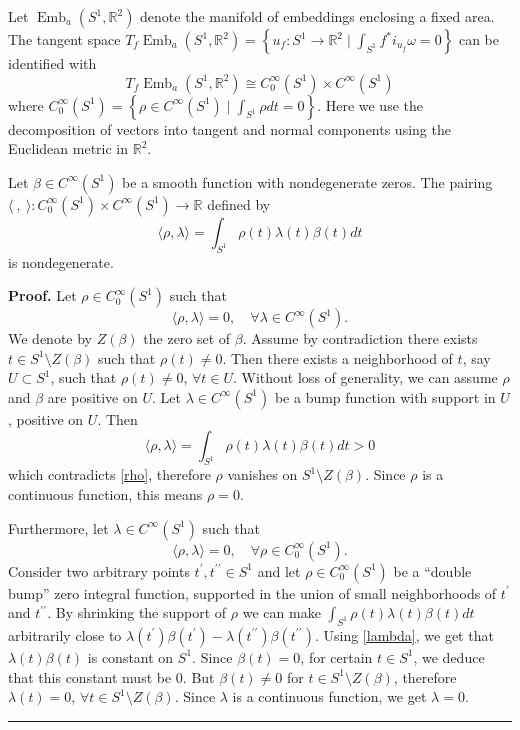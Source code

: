 \documentclass[11pt]{article}
\newcommand\on{\operatorname}
\newcommand\Emb{\on{Emb}}
\newcommand\RR{\mathbb R}
\newenvironment{proof}[1][Proof]{\noindent\textbf{#1.} }{\ \rule{0.5em}{0.5em}}
\begin{document}
Let $\Emb_a(S^1, \RR^2)$ denote the manifold of embeddings enclosing a fixed area. The tangent space $T_f\Emb_a(S^1, \RR^2) = \left\{u_f : S^1 \rightarrow \RR^2 \mid \int_{S^1}f^*i_{u_f}\omega = 0\right\}$ can be identified with
\begin{equation}\label{tg_space}
T_f\Emb_a(S^1, \RR^2) \cong C_0^\infty(S^1) \times C^\infty(S^1)
\end{equation}
where $C_0^\infty(S^1) = \left\{\rho \in C^\infty(S^1) \mid \int_{S^1}\rho dt = 0\right\}$. Here we use the decomposition of vectors into tangent and normal components using the Euclidean metric in $\RR^2$. 


\begin{lemma}
Let $\beta \in C^\infty(S^1)$ be a smooth function with nondegenerate zeros. The pairing $\langle \ , \ \rangle: C_0^\infty(S^1) \times C^\infty(S^1) \to \RR$ defined by
\begin{equation}\label{pairing}
\langle\rho, \lambda\rangle = \int_{S^1}\rho(t)\lambda(t)\beta(t)dt
\end{equation}
is nondegenerate.
\end{lemma}
\begin{proof}
Let $\rho\in C_0^\infty(S^1)$ such that 
\begin{equation}\label{rho}
\langle\rho,\lambda\rangle = 0, \quad \forall \lambda \in C^\infty(S^1).
\end{equation} 
We denote by $Z(\beta)$ the zero set of $\beta$. Assume by contradiction there exists $t \in S^1\setminus Z(\beta)$ such that $\rho(t) \neq 0$. Then there exists a neighborhood of $t$, say $U \subset S^1$, such that $\rho(t) \neq 0$, $\forall t \in U$. Without loss of generality, we can assume $\rho$ and $\beta$ are positive on $U$. Let $\lambda \in C^\infty(S^1)$ be a bump function with support in $U$, positive on $U$. Then 
\begin{equation*}
\langle\rho, \lambda\rangle = \int_{S^1}\rho(t)\lambda(t)\beta(t)dt > 0
\end{equation*}
which contradicts \eqref{rho}, therefore $\rho$ vanishes on $S^1\setminus Z(\beta)$. Since $\rho$ is a continuous function, this means $\rho = 0$. 

Furthermore, let $\lambda \in C^\infty(S^1)$ such that 
\begin{equation}\label{lambda}
\langle\rho, \lambda\rangle = 0, \quad \forall \rho \in C_0^\infty(S^1). 
\end{equation}
Consider two arbitrary points $t^\prime, t^{\prime\prime} \in S^1$ and let $\rho \in C_0^\infty(S^1)$ be a ``double bump'' zero integral function, supported in the union of small neighborhoods of $t^\prime$ and $t^{\prime\prime}$. By shrinking the support of $\rho$ we can make $\int_{S^1}\rho(t)\lambda(t)\beta(t)dt$ arbitrarily close to $\lambda(t^\prime)\beta(t^\prime) - \lambda(t^{\prime\prime})\beta(t^{\prime\prime})$. Using \eqref{lambda}, we get that $\lambda(t)\beta(t)$ is constant on $S^1$. Since $\beta(t) = 0$, for certain $t \in S^1$, we deduce that this constant must be 0. But $\beta(t) \neq 0$ for $t \in S^1 \setminus Z(\beta)$, therefore $\lambda(t) = 0$, $\forall t \in S^1\setminus Z(\beta)$. Since $\lambda$ is a continuous function, we get $\lambda = 0$. 
\end{proof}
\end{document}
